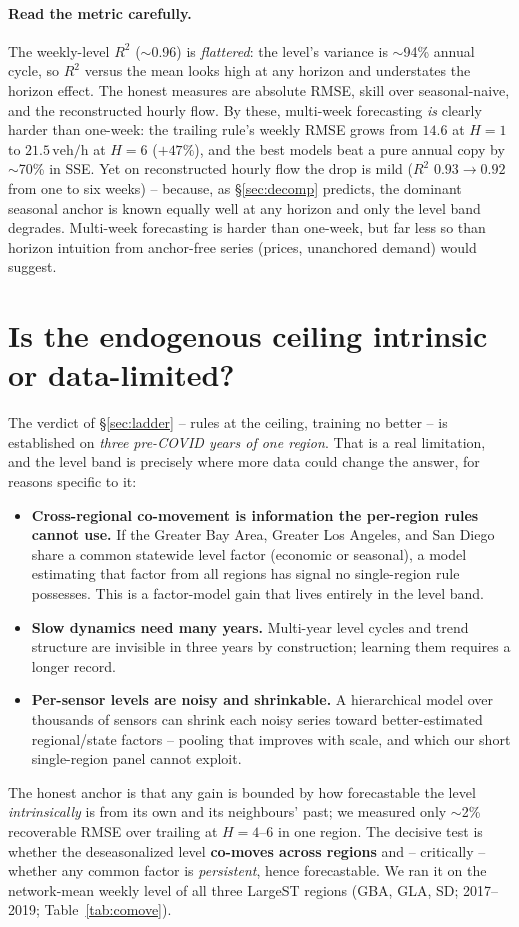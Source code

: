 \documentclass[11pt]{article}
\newcommand{\veh}{\,\text{veh/h}}
\begin{document}
\paragraph{Read the metric carefully.} The weekly-level $R^2$ ($\sim$0.96) is
\emph{flattered}: the level's variance is $\sim$94\% annual cycle, so $R^2$ versus
the mean looks high at any horizon and understates the horizon effect. The honest
measures are absolute RMSE, skill over seasonal-naive, and the reconstructed hourly
flow. By these, multi-week forecasting \emph{is} clearly harder than one-week: the
trailing rule's weekly RMSE grows from $14.6$ at $H{=}1$ to $21.5\veh$ at $H{=}6$
($+47\%$), and the best models beat a pure annual copy by $\sim$70\% in SSE. Yet on
reconstructed hourly flow the drop is mild ($R^2$ $0.93\!\to\!0.92$ from one to six
weeks) -- because, as \S\ref{sec:decomp} predicts, the dominant seasonal anchor is
known equally well at any horizon and only the level band degrades. Multi-week
forecasting is harder than one-week, but far less so than horizon intuition from
anchor-free series (prices, unanchored demand) would suggest.

\section{Is the endogenous ceiling intrinsic or data-limited?}
\label{sec:limits}
The verdict of \S\ref{sec:ladder} -- rules at the ceiling, training no better -- is
established on \emph{three pre-COVID years of one region}. That is a real
limitation, and the level band is precisely where more data could change the
answer, for reasons specific to it:
\begin{itemize}
\item \textbf{Cross-regional co-movement is information the per-region rules cannot
  use.} If the Greater Bay Area, Greater Los Angeles, and San Diego share a common
  statewide level factor (economic or seasonal), a model estimating that factor
  from all regions has signal no single-region rule possesses. This is a
  factor-model gain that lives entirely in the level band.
\item \textbf{Slow dynamics need many years.} Multi-year level cycles and trend
  structure are invisible in three years by construction; learning them requires a
  longer record.
\item \textbf{Per-sensor levels are noisy and shrinkable.} A hierarchical model
  over thousands of sensors can shrink each noisy series toward better-estimated
  regional/state factors -- pooling that improves with scale, and which our short
  single-region panel cannot exploit.
\end{itemize}
The honest anchor is that any gain is bounded by how forecastable the level
\emph{intrinsically} is from its own and its neighbours' past; we measured only
$\sim$2\% recoverable RMSE over trailing at $H{=}4$--$6$ in one region. The
decisive test is whether the deseasonalized level \textbf{co-moves across regions}
and -- critically -- whether any common factor is \emph{persistent}, hence
forecastable. We ran it on the network-mean weekly level of all three LargeST
regions (GBA, GLA, SD; 2017--2019; Table~\ref{tab:comove}).
\end{document}
